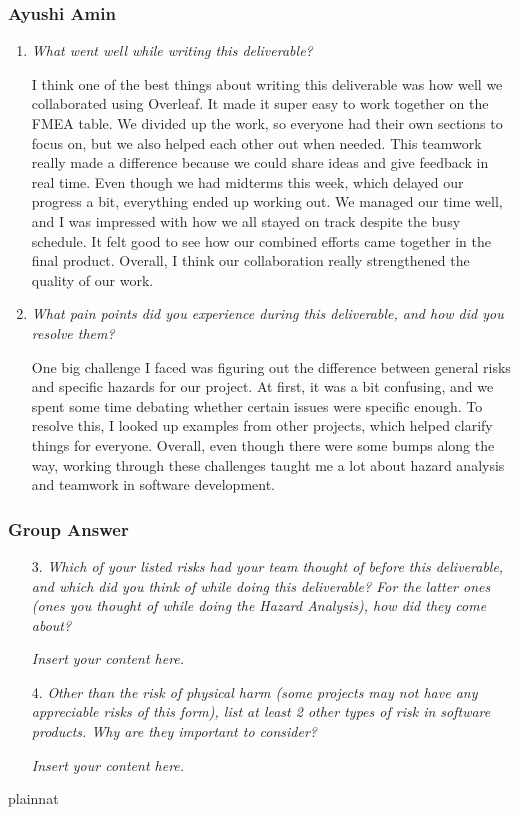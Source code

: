 \documentclass{article}
\newcommand{\lips}{\textit{Insert your content here.}}
\begin{document}
\subsubsection*{Ayushi Amin}

\begin{enumerate}
  \item \textit{What went well while writing this deliverable?}
  
  I think one of the best things about writing this deliverable was how well we collaborated using Overleaf. It made it super easy to 
  work together on the FMEA table. We divided up the work, so everyone had their own sections to focus on, but we also helped each 
  other out when needed. This teamwork really made a difference because we could share ideas and give feedback in real time.
  Even though we had midterms this week, which delayed our progress a bit, everything ended up working out. We managed our time well, 
  and I was impressed with how we all stayed on track despite the busy schedule. It felt good to see how our combined efforts came 
  together in the final product. Overall, I think our collaboration really strengthened the quality of our work.

  \item \textit{What pain points did you experience during this deliverable, and how did you resolve them?}
  
  One big challenge I faced was figuring out the difference between general risks and specific hazards for our project. At first, it was 
  a bit confusing, and we spent some time debating whether certain issues were specific enough. To resolve this, I looked up examples from
  other projects, which helped clarify things for everyone. Overall, even though there were some bumps along the way, working through these 
  challenges taught me a lot about hazard analysis and teamwork in software development.
  
\end{enumerate}

\subsubsection*{Group Answer}

\begin{enumerate}
    \item[3.] \textit{Which of your listed risks had your team thought of before this deliverable, and which did you think of while doing this deliverable? For the latter ones (ones you thought of while doing the Hazard Analysis), how did they come about?}
    
    \lips

    \item[4.] \textit{Other than the risk of physical harm (some projects may not have any appreciable risks of this form),
    list at least 2 other types of risk in software products. Why are they important to consider?}

    \lips

\end{enumerate}

 {plainnat}

\end{document}
